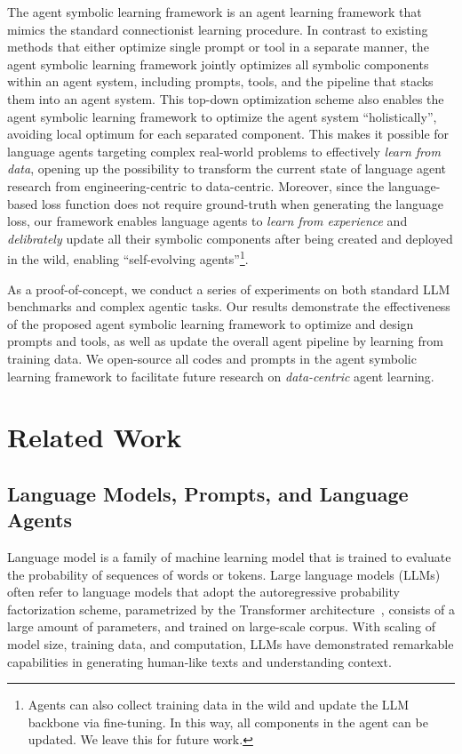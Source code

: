 \documentclass{article}
\newcommand{\baby}{agent symbolic learning\xspace}
\begin{document}
The \baby framework is an agent learning framework that mimics the standard connectionist learning procedure. In contrast to existing methods that either optimize single prompt or tool in a separate manner, the \baby framework jointly optimizes all symbolic components within an agent system, including prompts, tools, and the pipeline that stacks them into an agent system. This top-down optimization scheme also enables the \baby framework to optimize the agent system ``holistically'', avoiding local optimum for each separated component. This makes it possible for language agents targeting complex real-world problems to effectively \textit{learn from data}, opening up the possibility to transform the current state of language agent research from engineering-centric to data-centric. Moreover, since the language-based loss function does not require ground-truth when generating the language loss, our framework enables language agents to \textit{learn from experience} and \textit{delibrately} update all their symbolic components after being created and deployed in the wild, enabling ``self-evolving agents''\footnote{Agents can also collect training data in the wild and update the LLM backbone via fine-tuning. In this way, all components in the agent can be updated. We leave this for future work.}.

As a proof-of-concept, we conduct a series of experiments on both standard LLM benchmarks and complex agentic tasks. Our results demonstrate the effectiveness of the proposed \baby framework to optimize and design prompts and tools, as well as update the overall agent pipeline by learning from training data. We open-source all codes and prompts in the \baby framework to facilitate future research on \textit{data-centric} agent learning. 





\section{Related Work}

\subsection{Language Models, Prompts, and Language Agents}

Language model is a family of machine learning model that is trained to evaluate the probability of sequences of words or tokens. Large language models (LLMs)~\citep{gpt,gpt2,gpt3,gpt3.5,gpt4,llama,llama2}  often refer to language models that adopt the autoregressive probability factorization scheme, parametrized by the Transformer architecture~\citep{vaswani2017attention}, consists of a large amount of parameters, and trained on large-scale corpus. With scaling of model size, training data, and computation, LLMs have demonstrated remarkable capabilities in generating human-like texts and understanding context. 
\end{document}
